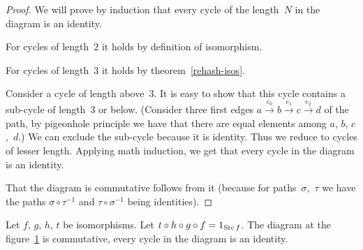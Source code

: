 \begin{proof}
We will prove by induction that every cycle of the length~$N$ in
the diagram is an identity.

For cycles of length~$2$ it holds by definition of isomorphism.

For cycles of length~$3$ it holds by theorem~\ref{rehash-isos}.

Consider a cycle of length above~$3$. It is easy to show that this
cycle contains a sub-cycle of length~$3$ or below. (Consider three
first edges $a\overset{e_{0}}{\rightarrow}b\overset{e_{1}}{\rightarrow}c\overset{e_{2}}{\rightarrow}d$
of the path, by pigeonhole principle we have that there are equal
elements among $a$, $b$, $c$,~$d$.) We can exclude the sub-cycle
because it is identity. Thus we reduce to cycles of lesser length.
Applying math induction, we get that every cycle in the diagram is
an identity.

That the diagram is commutative follows from it (because for paths~$\sigma$,~$\tau$
we have the paths $\sigma\circ\tau^{-1}$ and $\tau\circ\sigma^{-1}$
being identities).\end{proof}
\begin{lem}
\label{four-loop-lem}Let $f$, $g$, $h$, $t$ be isomorphisms.
Let $t\circ h\circ g\circ f=1_{\operatorname{Src} f}$. The diagram at the figure~\ref{four-loop}
is commutative, every cycle in the diagram is an identity.

\begin{figure}[ht]
\caption{\label{four-loop}}


\end{figure}
\end{lem}

